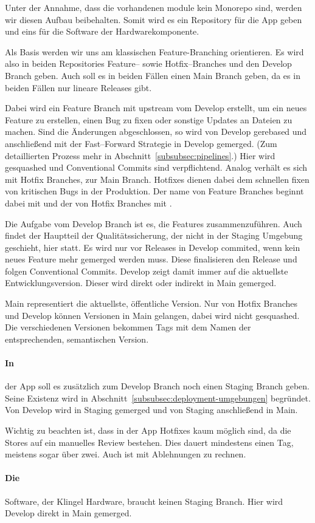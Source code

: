 Unter der Annahme, dass die vorhandenen module kein Monorepo sind, werden wir diesen Aufbau beibehalten.
Somit wird es ein Repository für die App geben und eins für die Software der Hardwarekomponente.


Als Basis werden wir uns am klassischen Feature-Branching orientieren.
Es wird also in beiden Repositories Feature-- sowie Hotfix--Branches und den Develop Branch geben.
Auch soll es in beiden Fällen einen Main Branch geben, da es in beiden Fällen nur lineare Releases gibt.


Dabei wird ein Feature Branch mit upstream vom Develop erstellt, um ein neues Feature zu erstellen, einen Bug zu fixen oder sonstige Updates an Dateien zu machen.
Sind die Änderungen abgeschlossen, so wird von Develop gerebased und anschließend mit der Fast--Forward Strategie in Develop gemerged.
(Zum detaillierten Prozess mehr in Abschnitt~\ref{subsubsec:pipelines}.)
Hier wird gesquashed und Conventional Commits sind verpflichtend.
Analog verhält es sich mit Hotfix Branches, zur Main Branch.
Hotfixes dienen dabei dem schnellen fixen von kritischen Bugs in der Produktion.
Der name von Feature Branches beginnt dabei mit  und der von Hotfix Branches mit .


Die Aufgabe vom Develop Branch ist es, die Features zusammenzuführen.
Auch findet der Hauptteil der Qualitätssicherung, der nicht in der Staging Umgebung geschieht, hier statt.
Es wird nur vor Releases in Develop commited, wenn kein neues Feature mehr gemerged werden muss.
Diese finalisieren den Release und folgen Conventional Commits.
Develop zeigt damit immer auf die aktuellste Entwicklungsversion.
Dieser wird direkt oder indirekt in Main gemerged.


Main representiert die aktuellste, öffentliche Version.
Nur von Hotfix Branches und Develop können Versionen in Main gelangen, dabei wird nicht gesquashed.
Die verschiedenen Versionen bekommen Tags mit dem Namen der entsprechenden, semantischen Version.


\paragraph{In} der App soll es zusätzlich zum Develop Branch noch einen Staging Branch geben.
    Seine Existenz wird in Abschnitt~\ref{subsubsec:deployment-umgebungen} begründet.
    Von Develop wird in Staging gemerged und von Staging anschließend in Main.


    Wichtig zu beachten ist, dass in der App Hotfixes kaum möglich sind, da die Stores auf ein manuelles Review bestehen.
    Dies dauert mindestens einen Tag, meistens sogar über zwei.
    Auch ist mit Ablehnungen zu rechnen.


\paragraph{Die} Software, der Klingel Hardware, braucht keinen Staging Branch.
    Hier wird Develop direkt in Main gemerged.